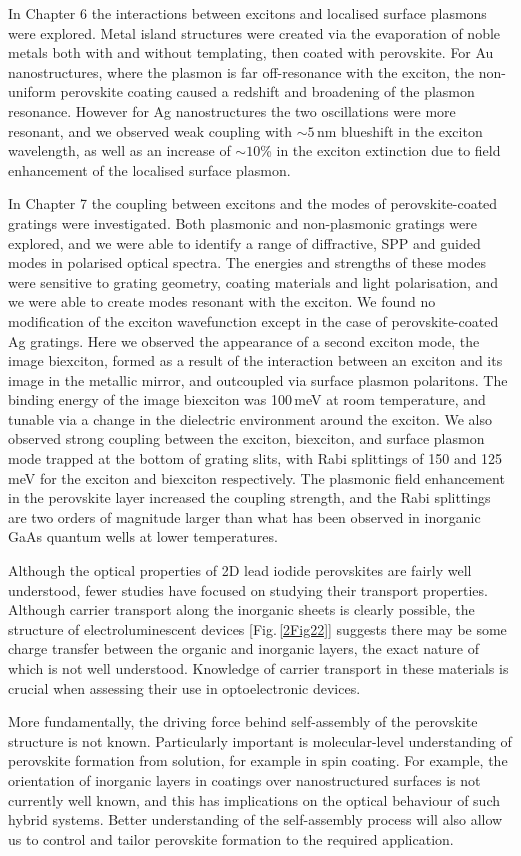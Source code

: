 In Chapter 6 the interactions between excitons and localised surface plasmons were explored. Metal island structures were created via the evaporation of noble metals both with and without templating, then coated with perovskite. For Au nanostructures, where the plasmon is far off-resonance with the exciton, the non-uniform perovskite coating caused a redshift and broadening of the plasmon resonance. However for Ag nanostructures the two oscillations were more resonant, and we observed weak coupling with $\sim 5$\,nm blueshift in the exciton wavelength, as well as an increase of $\sim 10$\% in the exciton extinction due to field enhancement of the localised surface plasmon.

In Chapter 7 the coupling between excitons and the modes of perovskite-coated gratings were investigated. Both plasmonic and non-plasmonic gratings were explored, and we were able to identify a range of diffractive, SPP and guided modes in polarised optical spectra. The energies and strengths of these modes were sensitive to grating geometry, coating materials and light polarisation, and we were able to create modes resonant with the exciton. We found no modification of the exciton wavefunction except in the case of perovskite-coated Ag gratings. Here we observed the appearance of a second exciton mode, the image biexciton, formed as a result of the interaction between an exciton and its image in the metallic mirror, and outcoupled via surface plasmon polaritons. The binding energy of the image biexciton was 100\,meV at room temperature, and tunable via a change in the dielectric environment around the exciton. We also observed strong coupling between the exciton, biexciton, and surface plasmon mode trapped at the bottom of grating slits, with Rabi splittings of 150 and 125\,meV for the exciton and biexciton respectively. The plasmonic field enhancement in the perovskite layer increased the coupling strength, and the Rabi splittings are two orders of magnitude larger than what has been observed in inorganic GaAs quantum wells at lower temperatures.

Although the optical properties of 2D lead iodide perovskites are fairly well understood, fewer studies have focused on studying their transport properties. Although carrier transport along the inorganic sheets is clearly possible, the structure of electroluminescent devices [Fig.\,\ref{2Fig22}] suggests there may be some charge transfer between the organic and inorganic layers, the exact nature of which is not well understood. Knowledge of carrier transport in these materials is crucial when assessing their use in optoelectronic devices.

More fundamentally, the driving force behind self-assembly of the perovskite structure is not known. Particularly important is molecular-level understanding of perovskite formation from solution, for example in spin coating. For example, the orientation of inorganic layers in coatings over nanostructured surfaces is not currently well known, and this has implications on the optical behaviour of such hybrid systems. Better understanding of the self-assembly process will also allow us to control and tailor perovskite formation to the required application.